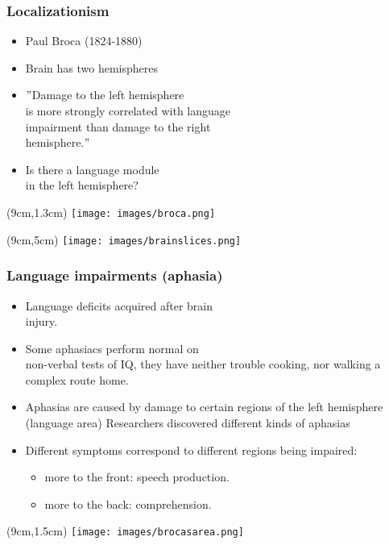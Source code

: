 \documentclass[12pt, table]{beamer}
\begin{document}
\begin{frame}
\frametitle{Localizationism}
\begin{itemize}
\item Paul Broca (1824-1880)
\item Brain has two hemispheres
\item $"$Damage to the left hemisphere \\ is more strongly correlated with language \\ impairment than damage to the right \\ hemisphere.$"$
\item Is there a language module \\ in the left hemisphere?
\end{itemize}
\begin{textblock*}{8cm}(9cm,1.3cm)
\texttt{[image: images/broca.png]}
\end{textblock*}
\begin{textblock*}{8cm}(9cm,5cm)
\texttt{[image: images/brainslices.png]}
\end{textblock*}
\end{frame}

\begin{frame}
\frametitle{Language impairments (aphasia)}
\begin{itemize}
\item Language deficits acquired after brain \\ injury.
\item Some aphasiacs perform normal on \\ non-verbal tests of IQ, they have neither trouble cooking, nor walking a complex route home. 
\item Aphasias are caused by damage to certain regions of the left hemisphere (language area)
Researchers discovered different kinds of aphasias 
\item Different symptoms correspond to different regions being impaired:
\begin{itemize}
\item more to the front: speech production.
\item more to the back: comprehension.
\end{itemize}
\end{itemize}
\begin{textblock*}{8cm}(9cm,1.5cm)
\texttt{[image: images/brocasarea.png]}
\end{textblock*}
\end{frame}
\end{document}
